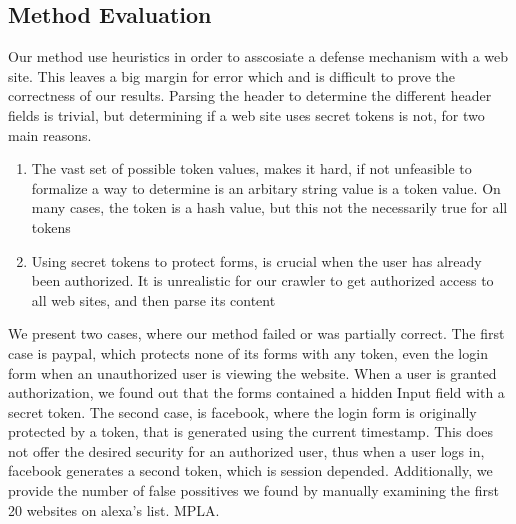 \subsection{Method Evaluation}
Our method use heuristics in order to asscosiate a defense mechanism with a web site.  This leaves a big margin
for error which and is difficult to prove the correctness of our results.  Parsing the header to determine the
different header fields is trivial, but determining if a web site uses secret tokens is not, for two main reasons.
\begin{enumerate}
 \item The vast set of possible token values, makes it hard, if not unfeasible to formalize a way to determine 
 is an arbitary string value is a token value.  On many cases, the token is a hash value, but this not the 
 necessarily true for all tokens
 \item Using secret tokens to protect forms, is crucial when the user has already been authorized.  It 
 is unrealistic for our crawler to get authorized access to all web sites, and then parse its content
\end{enumerate} 
We present two cases, where our method failed or was partially correct.  The first case is paypal, which protects none
of its forms with any token, even the login form when an unauthorized user is viewing the website.  When a user is granted
authorization, we found out that the forms contained a hidden Input field with a secret token.  The second case, is 
facebook, where the login form is originally protected by a token, that is generated using the current timestamp.  This
does not offer the desired security for an authorized user, thus when a user logs in, facebook generates a second 
token, which is session depended.  Additionally, we provide the number of false possitives we found by manually examining 
the first 20 websites on alexa's list. MPLA. 
 